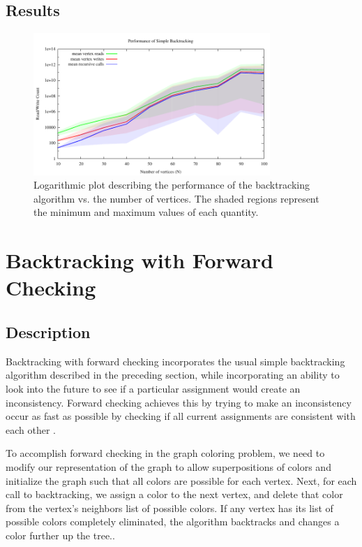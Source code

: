 \documentclass{article}
\begin{document}
	
	\subsection{Results}
	
		
	
		\begin{figure}[h!]
			\centering
			\includegraphics[width=0.8\textwidth]{../results_4/backtracking_simple/bt_simple_performance}
			\caption{Logarithmic plot describing the performance of the backtracking algorithm vs. the number of vertices. The shaded regions represent the minimum and maximum values of each quantity.}
		\end{figure}
	
\section{Backtracking with Forward Checking}

	\subsection{Description}
	
		Backtracking with forward checking incorporates the usual simple backtracking algorithm described in the preceding section, while incorporating an ability to look into the future to see if a particular assignment would create an inconsistency. Forward checking achieves this by trying to make an inconsistency occur as fast as possible by checking if all current assignments are consistent with each other \cite{haralick}.
		
		To accomplish forward checking in the graph coloring problem, we need to modify our representation of the graph to allow superpositions of colors and initialize the graph such that all colors are possible for each vertex. Next, for each call to backtracking, we assign a color to the next vertex, and delete that color from the vertex's neighbors list of possible colors. If any vertex has its list of possible colors completely eliminated, the algorithm backtracks and changes a color further up the tree.\cite{ai}.
		
\end{document}
